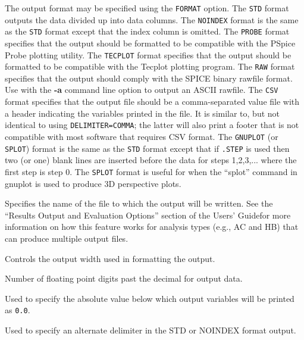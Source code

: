 \begin{Command}
\begin{Arguments}
The output format may be specified using the \texttt{FORMAT} option.
The \texttt{STD} format outputs the data divided up into data columns.
The \texttt{NOINDEX} format is the same as the \texttt{STD} format
except that the index column is omitted. The \texttt{PROBE} format
specifies that the output should be formatted to be compatible with the
 PSpice Probe plotting utility.  The
\texttt{TECPLOT} format specifies that the output should be formatted to
be compatible with the Tecplot plotting program.  The \texttt{RAW}
format specifies that the output should comply with the SPICE binary
rawfile format.  Use with the {\bf -a} command line option to output an
ASCII rawfile.  The \texttt{CSV} format specifies that the output file
should be a comma-separated value file with a header indicating the
variables printed in the file.  It is similar to, but not identical to
using \texttt{DELIMITER=COMMA}; the latter will also print a footer that
is not compatible with most software that requires CSV format.  The \texttt{GNUPLOT}
(or \texttt{SPLOT}) format is the same as the \texttt{STD} format except
that if \texttt{.STEP} is used then two (or one) blank lines are inserted
before the data for steps 1,2,3,... where the first step is step 0. The
\texttt{SPLOT} format is useful for when the ``splot'' command in gnuplot
is used to produce 3D perspective plots.


Specifies the name of the file to which the output will be written.
See the ``Results Output and Evaluation Options'' section of the 
\Xyce{} Users' Guide\UsersGuide for more information on how this
feature works for analysis types (e.g., AC and HB) that can produce 
multiple output files. 


Controls the output width used in formatting the output.


Number of floating point digits past the decimal for output data.


Used to specify the absolute value below which output variables will be
printed as \texttt{0.0}.


Used to specify an alternate delimiter in the STD or NOINDEX format
output.


\end{Arguments}
\end{Command}
